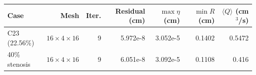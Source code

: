 \begin{tabular}{@{}lrrrrrr@{}}
\toprule
Case & Mesh & Iter. & Residual (cm) & $\max\eta$ (cm) & $\min R$ (cm) & $\langle Q\rangle$ (cm$^3$/s) \\
\midrule
C23 (22.56\%) & $16\times4\times16$ & 9 & 5.972e-8 & 3.052e-5 & 0.1402 & 0.5472 \\
40\% stenosis & $16\times4\times16$ & 9 & 6.051e-8 & 3.092e-5 & 0.1108 & 0.416 \\
\bottomrule
\end{tabular}
